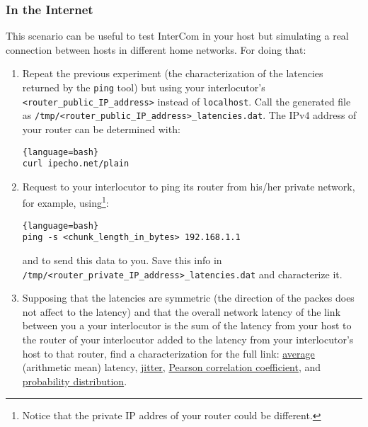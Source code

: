 \subsubsection{In the Internet}

This scenario can be useful to test InterCom in your host but
simulating a real connection between hosts in different home
networks. For doing that:

\begin{enumerate}
  
\item Repeat the previous experiment (the characterization of the
  latencies returned by the \texttt{ping} tool) but using your
  interlocutor's \texttt{<router\_public\_IP\_address>} instead of
  \texttt{localhost}. Call the generated file as
  \texttt{/tmp/<router\_public\_IP\_address>\_latencies.dat}. The IPv4
  address of your router can be determined with:
  
  \begin{lstlisting}{language=bash}
curl ipecho.net/plain
  \end{lstlisting}  
  
\item Request to your interlocutor to ping its router from his/her
  private network, for example, using\footnote{Notice that the private
    IP addres of your router could be different.}:
  
  \begin{lstlisting}{language=bash}
ping -s <chunk_length_in_bytes> 192.168.1.1
  \end{lstlisting}
  
  and to send this data to you. Save this info in
  \texttt{/tmp/<router\_private\_IP\_address>\_latencies.dat} and
  characterize it.

\item Supposing that the latencies are symmetric (the direction of the
  packes does not affect to the latency) and that the overall network
  latency of the link between you a your interlocutor is the sum of
  the latency from your host to the router of your interlocutor added to
  the latency from your interlocutor's host to that router, find a
  characterization for the full link:
  \href{https://en.wikipedia.org/wiki/Average}{average} (arithmetic
  mean) latency, \href{https://en.wikipedia.org/wiki/Jitter}{jitter},
  \href{https://en.wikipedia.org/wiki/Pearson_correlation_coefficient}{Pearson
    correlation coefficient}, and
  \href{https://en.wikipedia.org/wiki/List_of_probability_distributions}{probability
    distribution}.

\end{enumerate}

